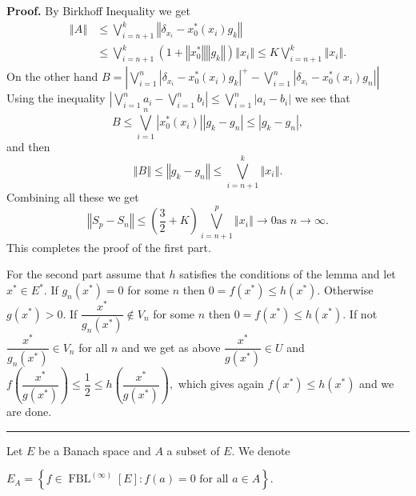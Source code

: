 \documentclass[12pt]{article}%
\newenvironment{proof}[1][Proof]{\noindent\textbf{#1.} }{\ \rule{0.5em}{0.5em}}
\begin{document}
\begin{proof}
By Birkhoff Inequality we get%
\begin{align*}
\left\Vert A\right\Vert  &  \leq\bigvee\limits_{i=n+1}^{k}\left\Vert
\delta_{x_{i}}-x_{0}^{\ast}\left(  x_{i}\right)  g_{k}\right\Vert \\
&  \leq\bigvee\limits_{i=n+1}^{k}\left(  1+\left\Vert x_{0}^{\ast}\right\Vert
\left\Vert g_{k}\right\Vert \right)  \left\Vert x_{i}\right\Vert \leq
K\bigvee\limits_{i=n+1}^{k}\left\Vert x_{i}\right\Vert .
\end{align*}
On the other hand $B=\left\vert \bigvee\limits_{i=1}^{n}\left\vert
\delta_{x_{i}}-x_{0}^{\ast}\left(  x_{i}\right)  g_{k}\right\vert ^{+}%
-\bigvee\limits_{i=1}^{n}\left\vert \delta_{x_{i}}-x_{0}^{\ast}\left(
x_{i}\right)  g_{n}\right\vert \right\vert $ Using the inequality $\left\vert
\bigvee\limits_{i=1}^{n}a_{i}-\bigvee\limits_{i=1}^{n}b_{i}\right\vert
\leq\bigvee\limits_{i=1}^{n}\left\vert a_{i}-b_{i}\right\vert $ we see that
\[
B\leq\bigvee\limits_{i=1}^{n}\left\vert x_{0}^{\ast}\left(  x_{i}\right)
\right\vert \left\vert g_{k}-g_{n}\right\vert \leq\left\vert g_{k}%
-g_{n}\right\vert ,
\]
and then%
\[
\left\Vert B\right\Vert \leq\left\Vert g_{k}-g_{n}\right\Vert \leq
\bigvee\limits_{i=n+1}^{k}\left\Vert x_{i}\right\Vert .
\]
Combining all these we get%
\[
\left\Vert S_{p}-S_{n}\right\Vert \leq\left(  \dfrac{3}{2}+K\right)
\bigvee\limits_{i=n+1}^{p}\left\Vert x_{i}\right\Vert \longrightarrow0\text{
as }n\longrightarrow\infty.
\]
This completes the proof of the first part.

For the second part assume that $h$ satisfies the conditions of the lemma and
let $x^{\ast}\in E^{\ast}.$ If $g_{n}\left(  x^{\ast}\right)  =0$ for some $n$
then $0=f\left(  x^{\ast}\right)  \leq h\left(  x^{\ast}\right)  .$ Otherwise
$g\left(  x^{\ast}\right)  >0$. If $\dfrac{x^{\ast}}{g_{n}\left(  x^{\ast
}\right)  }\notin V_{n}$ for some $n$ then $0=f\left(  x^{\ast}\right)  \leq
h\left(  x^{\ast}\right)  .$ If not $\dfrac{x^{\ast}}{g_{n}\left(  x^{\ast
}\right)  }\in V_{n}$ for all $n$ and we get as above $\dfrac{x^{\ast}%
}{g\left(  x^{\ast}\right)  }\in U$ and $f\left(  \dfrac{x^{\ast}}{g\left(
x^{\ast}\right)  }\right)  \leq\dfrac{1}{2}\leq h\left(  \dfrac{x^{\ast}%
}{g\left(  x^{\ast}\right)  }\right)  ,$ which gives again $f\left(  x^{\ast
}\right)  \leq h\left(  x^{\ast}\right)  $ and we are done.
\end{proof}

Let $E$ be a Banach space and $A$ a subset of $E.$ We denote

\begin{center}
$E_{A}=\left\{  f\in\operatorname*{FBL}\nolimits^{\left(  \infty\right)
}\left[  E\right]  :f\left(  a\right)  =0\text{ for all }a\in A\right\}  .$
\end{center}
\end{document}
